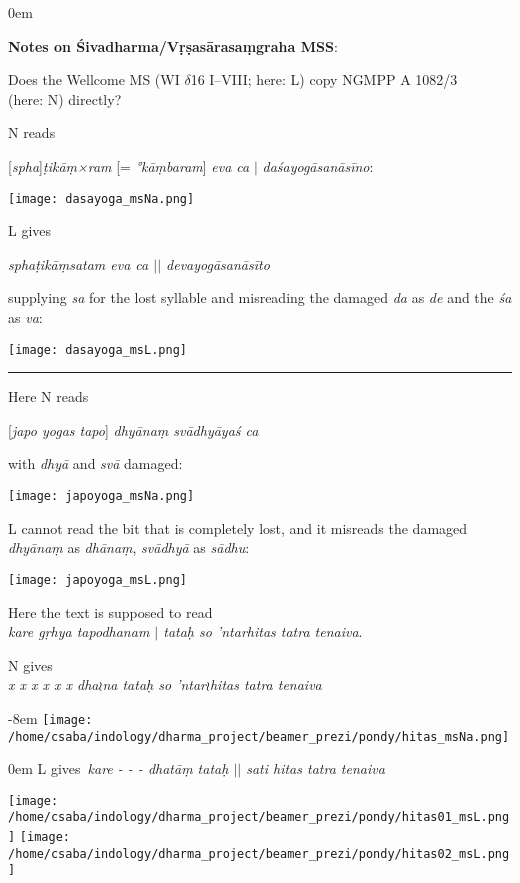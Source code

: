 \documentclass{article}
\newcommand{\uncl}[1]{${\wr}$#1${\wr}$}
\begin{document}
\parindent0em

\begin{center}\textbf{Notes on Śivadharma/Vṛṣasārasaṃgraha MSS}:

\end{center}

Does the Wellcome MS (WI $\delta$16 I–VIII; here: L) copy NGMPP A 1082/3\\
 (here: N) directly?

\bigskip

N reads 

[\textit{spha}]\textit{ṭikāṃ×ram} [= \textit{°kāṃbaram}] \textit{eva ca} $|$
\textit{daśayogāsanāsīno}:
\smallskip

\texttt{[image: dasayoga\_msNa.png]}
\medskip

L gives

\textit{sphaṭikāṃsatam eva ca $||$ devayogāsanāsīto}

supplying \textit{sa} for the lost syllable and misreading the 
damaged \textit{da} as \textit{de} and the \textit{śa} as \textit{va}:
\smallskip

\texttt{[image: dasayoga\_msL.png]}

\bigskip
\hrule
\bigskip

Here N reads

[\textit{japo yogas tapo}] \textit{dhyānaṃ svādhyāyaś ca} 

with \textit{dhyā} and \textit{svā} damaged:

\smallskip
\texttt{[image: japoyoga\_msNa.png]}
\medskip

L cannot read the bit that is completely lost, and it misreads 
the damaged \textit{dhyānaṃ} as \textit{dhānaṃ}, \textit{svādhyā} as \textit{sādhu}:
\smallskip

\texttt{[image: japoyoga\_msL.png]}

\vfill\pagebreak

Here the text is supposed to read\\ 
\textit{kare gṛhya tapodhanam $|$ tataḥ so 'ntarhitas{ }tatra tenaiva}.

N gives\\
\textit{x x x x x x dha\uncl{na tataḥ so 'ntar}hitas tatra tenaiva}
\medskip

\leftskip-8em
\texttt{[image: /home/csaba/indology/dharma\_project/beamer\_prezi/pondy/hitas\_msNa.png]}

\medskip

\leftskip0em
L gives\
\textit{kare - - - dhatāṃ tataḥ $||$ sati hitas tatra tenaiva}

\medskip
\texttt{[image: /home/csaba/indology/dharma\_project/beamer\_prezi/pondy/hitas01\_msL.png]}
\texttt{[image: /home/csaba/indology/dharma\_project/beamer\_prezi/pondy/hitas02\_msL.png]}
\end{document}
